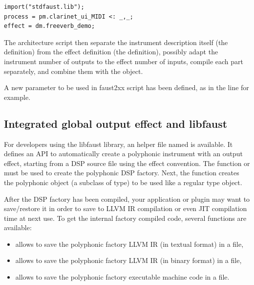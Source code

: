 \begin{lstlisting}
import("stdfaust.lib");
process = pm.clarinet_ui_MIDI <: _,_;
effect = dm.freeverb_demo;
\end{lstlisting}

The architecture script then separate the instrument description itself (the  definition) from the effect definition (the   definition), possibly adapt the instrument number of outputs to the effect number of inputs, compile each part separately, and combine them with the  object.

A new  parameter to be used in faust2xx script has been defined, as in the  line for example.

\subsection{Integrated global output effect and libfaust}

For developers using the libfaust library, an helper file named  is available. It defines an API to automatically create a polyphonic instrument with an output effect, starting from a DSP source file using the  effect  convention. The function  or  \\  must be used to create the polyphonic DSP factory. Next, the  function creates the polyphonic object (a subclass of  type) to be used like a regular  type object. 

After the DSP factory has been compiled, your application or plugin may want to save/restore it in order to save \faust to LLVM IR compilation or even JIT compilation time at next use. To get the internal factory compiled code, several functions are available:

\begin{itemize}
\item {} allows to save the polyphonic factory LLVM IR (in textual format) in a file,
\item {} allows to save the polyphonic factory LLVM IR (in binary format) in a file,
\item {} allows to save the polyphonic factory executable machine code in a file.
\end{itemize}

